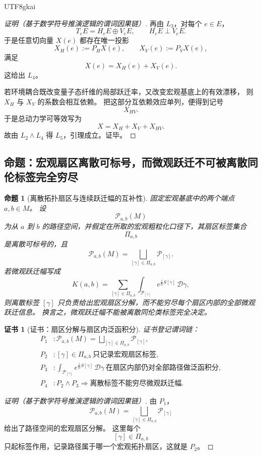 \documentclass[12pt]{article}
\newtheorem{proposition}{命题}[section]
\newtheorem{Certificate}{证书}[section]
\begin{document}
\begin{CJK*}{UTF8}{gkai}
\begin{proof}[证明（基于数学符号推演逻辑的谓词因果链）]
再由 $L_3$，对每个 $e\in E$，
\[
  T_eE=H_eE\oplus V_eE,
  \qquad
  H_eE\perp V_eE.
\]
于是任意切向量 $X(e)$ 都存在唯一投影
\[
  X_H(e):=P_HX(e),\qquad X_V(e):=P_VX(e),
\]
满足
\[
  X(e)=X_H(e)+X_V(e).
\]
这给出 $L_4$。

若环境耦合既改变量子态纤维的局部跃迁率，又改变宏观基底上的有效漂移，
则 $X_H$ 与 $X_V$ 的系数会相互依赖。
把这部分互依赖效应单列，便得到记号
\[
  X_{HV}.
\]
于是总动力学可等效写为
\[
  X=X_H+X_V+X_{HV}.
\]
故由 $L_2\wedge L_4$ 得 $L_5$，引理成立。证毕。
\end{proof}

\subsection{命题：宏观扇区离散可标号，而微观跃迁不可被离散同伦标签完全穷尽}
\label{subsec:tex43-proposition}

\begin{proposition}[离散拓扑扇区与连续跃迁幅的互补性]
\label{prop:tex43-sector-vs-transition}
固定宏观基底中的两个端点 $a,b\in M$。
设
\[
  \mathcal P_{a,b}(M)
\]
为从 $a$ 到 $b$ 的路径空间，并假定在所取的宏观粗粒化口径下，其扇区标签集合
\[
  \Pi_{a,b}
\]
是离散可标号的，且
\[
  \mathcal P_{a,b}(M)=\bigsqcup_{[\gamma]\in \Pi_{a,b}}\mathcal P_{[\gamma]}.
\]
若微观跃迁幅写成
\[
  K(a,b)
  =
  \sum_{[\gamma]\in\Pi_{a,b}}
  \int_{\mathcal P_{[\gamma]}}
  e^{\frac{i}{\hbar}S[\gamma]}\,\mathcal D\gamma,
\]
则离散标签 $[\gamma]$ 只负责给出宏观扇区分解，而不能穷尽每个扇区内部的全部微观跃迁信息。
换言之，微观跃迁幅不能被离散同伦类标签完全决定。
\end{proposition}

\begin{Certificate}[证书：扇区分解与扇区内泛函积分]
\label{cert:tex43-sector-vs-transition}
证书登记谓词链：
\[
\begin{aligned}
  P_1 &: \mathcal P_{a,b}(M)=\bigsqcup_{[\gamma]\in\Pi_{a,b}}\mathcal P_{[\gamma]},\\
  P_2 &: [\gamma]\in\Pi_{a,b}\ \text{只记录宏观扇区标签},\\
  P_3 &: \int_{\mathcal P_{[\gamma]}} e^{\frac{i}{\hbar}S[\gamma]}\,\mathcal D\gamma\ \text{在扇区内部仍对全部路径做泛函积分},\\
  P_4 &: P_2\wedge P_3\Rightarrow \text{离散标签不能穷尽微观跃迁幅}.
\end{aligned}
\]
\end{Certificate}

\begin{proof}[证明（基于数学符号推演逻辑的谓词因果链）]
由 $P_1$，
\[
  \mathcal P_{a,b}(M)=\bigsqcup_{[\gamma]\in\Pi_{a,b}}\mathcal P_{[\gamma]}
\]
给出了路径空间的宏观扇区分解。
这里每个
\[
  [\gamma]\in\Pi_{a,b}
\]
只起标签作用，记录路径属于哪一个宏观拓扑扇区，这就是 $P_2$。


\end{proof}
\end{CJK*}
\end{document}
